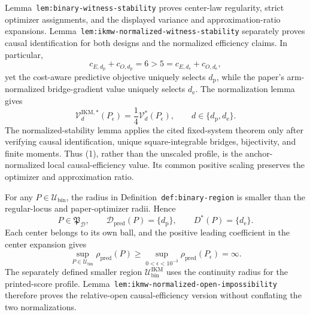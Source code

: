 Lemma~\texttt{lem:binary-witness-stability} proves center-law regularity, strict optimizer assignments, and the displayed variance and approximation-ratio expansions. Lemma~\texttt{lem:ikmw-normalized-witness-stability} separately proves causal identification for both designs and the normalized efficiency claims. In particular,
\[
 c_{E,d_{\mathrm p}}+c_{O,d_{\mathrm p}}=6>5
 =c_{E,d_{\mathrm e}}+c_{O,d_{\mathrm e}},
\]
yet the cost-aware predictive objective uniquely selects \(d_{\mathrm p}\), while the paper's arm-normalized bridge-gradient value uniquely selects \(d_{\mathrm e}\). The normalization lemma gives
\[
 \mathcal V_d^{\mathrm{IKM},*}(P_\epsilon)
 =\frac14\mathcal V_d^*(P_\epsilon),
 \qquad d\in\{d_{\mathrm p},d_{\mathrm e}\}. \tag{1}
\]
The normalized-stability lemma applies the cited fixed-system theorem only after verifying causal identification, unique square-integrable bridges, bijectivity, and finite moments. Thus (1), rather than the unscaled profile, is the anchor-normalized local causal-efficiency value. Its common positive scaling preserves the optimizer and approximation ratio.

For any \(P\in\mathcal U_{\mathrm{bin}}\), the radius in Definition~\texttt{def:binary-region} is smaller than the regular-locus and paper-optimizer radii. Hence
\[
 P\in\mathfrak P_{\mathcal D},\qquad
 \mathcal D_{\mathrm{pred}}(P)=\{d_{\mathrm p}\},
 \qquad D^*(P)=\{d_{\mathrm e}\}.
\]
Each center belongs to its own ball, and the positive leading coefficient in the center expansion gives
\[
 \sup_{P\in\mathcal U_{\mathrm{bin}}}\rho_{\mathrm{pred}}(P)
 \ge\sup_{0<\epsilon<10^{-3}}\rho_{\mathrm{pred}}(P_\epsilon)
 =\infty. \tag{2}
\]
The separately defined smaller region \(\mathcal U_{\mathrm{bin}}^{\mathrm{IKM}}\) uses the continuity radius for the printed-score profile. Lemma~\texttt{lem:ikmw-normalized-open-impossibility} therefore proves the relative-open causal-efficiency version without conflating the two normalizations.

